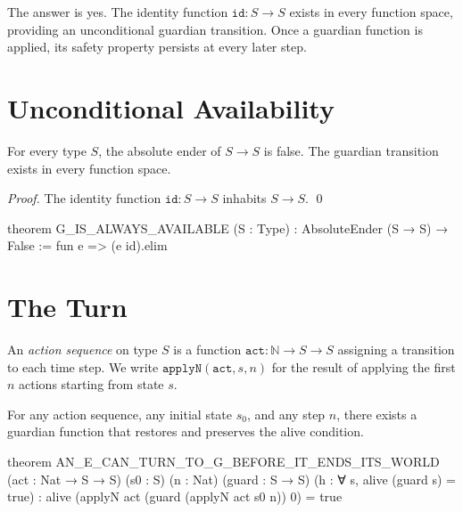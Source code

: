 The answer is yes. The identity function $\texttt{id} : S \to S$ exists in every function space, providing an unconditional guardian transition. Once a guardian function is applied, its safety property persists at every later step.

\section{Unconditional Availability}

\begin{theorem}\label{thm:available}
For every type $S$, the absolute ender of $S \to S$ is false. The guardian transition exists in every function space.
\end{theorem}

\begin{proof}
The identity function $\texttt{id} : S \to S$ inhabits $S \to S$. \qed
\end{proof}

\begin{leancode}
theorem G_IS_ALWAYS_AVAILABLE (S : Type) :
    AbsoluteEnder (S → S) → False :=
    fun e => (e id).elim
\end{leancode}

\section{The Turn}

\begin{definition}\label{def:action-seq}
An \emph{action sequence} on type $S$ is a function $\texttt{act} : \mathbb{N} \to S \to S$ assigning a transition to each time step. We write $\texttt{applyN}(\texttt{act}, s, n)$ for the result of applying the first $n$ actions starting from state $s$.
\end{definition}

\begin{theorem}\label{thm:e-turns}
For any action sequence, any initial state $s_0$, and any step $n$, there exists a guardian function that restores and preserves the alive condition.
\end{theorem}

\begin{leancode}
theorem AN_E_CAN_TURN_TO_G_BEFORE_IT_ENDS_ITS_WORLD
    (act : Nat → S → S) (s0 : S) (n : Nat)
    (guard : S → S) (h : ∀ s, alive (guard s) = true) :
    alive (applyN act (guard (applyN act s0 n)) 0) = true
\end{leancode}

